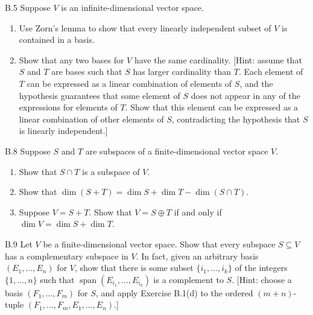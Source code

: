 \begin{exercise}{B.5}
    Suppose \( V \) is an infinite-dimensional vector space.
    \begin{enumerate}[label={(\alph*)}]
        \item Use Zorn’s lemma to show that every linearly independent subset of \( V \) is contained in a basis.
        \item Show that any two bases for \( V \) have the same cardinality. [Hint: assume that \( S \) and \( T \) are bases such that \( S \) has larger cardinality than \( T \). Each element of \( T \) can be expressed as a linear combination of elements of \( S \), and the hypothesis guarantees that some element of \( S \) does not appear in any of the expressions for elements of \( T \). Show that this element can be expressed as a linear combination of other elements of \( S \), contradicting the hypothesis that \( S \) is linearly independent.]
    \end{enumerate}
\end{exercise}

\begin{exercise}{B.8}
    Suppose \( S \) and \( T \) are subspaces of a finite-dimensional vector space \( V \).
    \begin{enumerate}[label={(\alph*)}]
        \item Show that \( S \cap T \) is a subspace of \( V \).
        \item Show that \( \dim(S + T) = \dim S + \dim T - \dim(S \cap T) \).
        \item Suppose \( V = S + T \). Show that \( V = S \oplus T \) if and only if \( \dim V = \dim S + \dim T \).
    \end{enumerate}
\end{exercise}

\begin{exercise}{B.9}
    Let \( V \) be a finite-dimensional vector space. Show that every subspace \( S \subseteq V \) has a complementary subspace in \( V \). In fact, given an arbitrary basis \( (E_{1}, \ldots, E_{n}) \) for \( V \), show that there is some subset \( \{i_{1}, \ldots, i_{k}\} \) of the integers \( \{1, \ldots, n\} \) such that \( \operatorname{span}(E_{i_{1}}, \ldots, E_{i_{k}}) \) is a complement to \( S \). [Hint: choose a basis \( (F_{1}, \ldots, F_{m}) \) for \( S \), and apply Exercise B.1(d) to the ordered \( (m + n) \)-tuple \( (F_{1}, \ldots, F_{m}, E_{1}, \ldots, E_{n}) \).]
\end{exercise}

